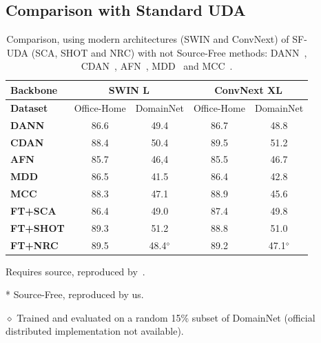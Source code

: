 \documentclass{article}
\begin{document}
\subsection{Comparison with Standard UDA \label{sec:vsuda}}
\begin{table}
\centering
\caption{Comparison, using modern architectures (SWIN and ConvNext) of SF-UDA (SCA, SHOT and NRC) with not Source-Free methods: DANN~\citep{ganin2016domain}, CDAN~\citep{cdan}, AFN~\citep{afn}, MDD~\citep{mdd} and MCC~\citep{mcc}.}
\label{table_uda}
\begin{threeparttable}
    \footnotesize
    
    \begin{tabular}{l|cc|cc}
    \textbf{Backbone} & \multicolumn{2}{c|}{SWIN L} & \multicolumn{2}{c}{ConvNext XL} \\
    \midrule
    \textbf{Dataset} & Office-Home & DomainNet  & Office-Home & DomainNet \\
    \midrule
    \textbf{DANN}\tnote{\textdagger} & 86.6 & 49.4 & 86.7 & 48.8 \\ \textbf{CDAN}\tnote{\textdagger} & 88.4 & 50.4 & 89.5 & 51.2 \\ \textbf{AFN}\tnote{\textdagger}  & 85.7 & 46,4 & 85.5 & 46.7 \\ \textbf{MDD}\tnote{\textdagger}  & 86.5 & 41.5 & 86.4 & 42.8 \\ \textbf{MCC}\tnote{\textdagger}  & 88.3 & 47.1 & 88.9 & 45.6 \\
    \midrule
    \textbf{FT+SCA}\tnote{*}  & 86.4 & 49.0 & 87.4 & 49.8 \\ 
    \textbf{FT+SHOT}\tnote{*} & 89.3 & 51.2 & 88.8 & 51.0 \\ 
    \textbf{FT+NRC}\tnote{*}  & 89.5 & 48.4$^\diamond$ & 89.2 & 47.1$^\diamond$ \\
    \bottomrule
    \end{tabular}
    \begin{tablenotes}
        \scriptsize
    
        \item[\textdagger] Requires source, reproduced by~\cite{kim2022broad}.
        \item[*] Source-Free, reproduced by us.
        \item[$\diamond$] Trained and evaluated on a random 15\% subset of DomainNet (official distributed implementation not available).
    \end{tablenotes}
    
\end{threeparttable}
\vspace{-0.5cm}
\end{table}
\end{document}
